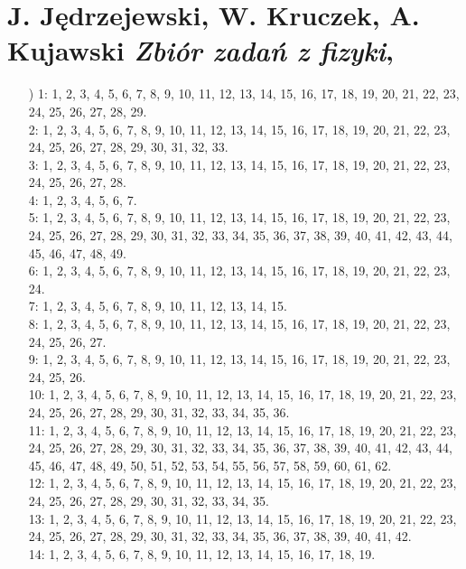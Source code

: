 \documentclass[a4paper,11pt]{article}
\numberwithin{equation}{section}
\begin{document}
\section{J. Jędrzejewski, W. Kruczek, A. Kujawski
  \textit{Zbiór zadań z fizyki}, \cite{JJWKAKZZF}}

\label{sec:Oznaczenia-i-konwencje}


\begin{itemize}

\item[\romannumeral1)] 1: 1, 2, 3, 4, 5, 6, 7, 8, 9, 10, 11, 12, 13,
  14, 15, 16, 17, 18, 19, 20, 21, 22, 23, 24, 25, 26, 27, 28, 29. \\
  2: 1, 2, 3, 4, 5, 6, 7, 8, 9, 10, 11, 12, 13, 14, 15, 16, 17, 18, 19, 20,
  21, 22, 23, 24, 25, 26, 27, 28, 29, 30, 31, 32, 33. \\
  3: 1, 2, 3, 4, 5, 6, 7, 8, 9, 10, 11, 12, 13, 14, 15, 16, 17, 18, 19, 20,
  21, 22, 23, 24, 25, 26, 27, 28. \\
  4: 1, 2, 3, 4, 5, 6, 7. \\
  5: 1, 2, 3, 4, 5, 6, 7, 8, 9, 10, 11, 12, 13, 14, 15, 16, 17, 18, 19, 20,
  21, 22, 23, 24, 25, 26, 27, 28, 29, 30, 31, 32, 33, 34, 35, 36, 37, 38,
  39, 40, 41, 42, 43, 44, 45, 46, 47, 48, 49. \\
  6: 1, 2, 3, 4, 5, 6, 7, 8, 9, 10, 11, 12, 13, 14, 15, 16, 17, 18, 19, 20,
  21, 22, 23, 24. \\
  7: 1, 2, 3, 4, 5, 6, 7, 8, 9, 10, 11, 12, 13, 14, 15. \\
  8: 1, 2, 3, 4, 5, 6, 7, 8, 9, 10, 11, 12, 13, 14, 15, 16, 17, 18, 19, 20,
  21, 22, 23, 24, 25, 26, 27. \\
  9: 1, 2, 3, 4, 5, 6, 7, 8, 9, 10, 11, 12, 13, 14, 15, 16, 17, 18, 19, 20,
  21, 22, 23, 24, 25, 26. \\
  10: 1, 2, 3, 4, 5, 6, 7, 8, 9, 10, 11, 12, 13, 14, 15, 16, 17, 18, 19, 20,
  21, 22, 23, 24, 25, 26, 27, 28, 29, 30, 31, 32, 33, 34, 35, 36. \\
  11: 1, 2, 3, 4, 5, 6, 7, 8, 9, 10, 11, 12, 13, 14, 15, 16, 17, 18, 19,
  20, 21, 22, 23, 24, 25, 26, 27, 28, 29, 30, 31, 32, 33, 34, 35, 36, 37,
  38, 39, 40, 41, 42, 43, 44, 45, 46, 47, 48, 49, 50, 51, 52, 53, 54, 55,
  56, 57, 58, 59, 60, 61, 62. \\
  12: 1, 2, 3, 4, 5, 6, 7, 8, 9, 10, 11, 12, 13, 14, 15, 16, 17, 18, 19, 20,
  21, 22, 23, 24, 25, 26, 27, 28, 29, 30, 31, 32, 33, 34, 35. \\
  13: 1, 2, 3, 4, 5, 6, 7, 8, 9, 10, 11, 12, 13, 14, 15, 16, 17, 18, 19,
  20, 21, 22, 23, 24, 25, 26, 27, 28, 29, 30, 31, 32, 33, 34, 35, 36, 37,
  38, 39, 40, 41, 42. \\
  14: 1, 2, 3, 4, 5, 6, 7, 8, 9, 10, 11, 12, 13, 14, 15, 16, 17, 18, 19.




\end{itemize}
\end{document}
